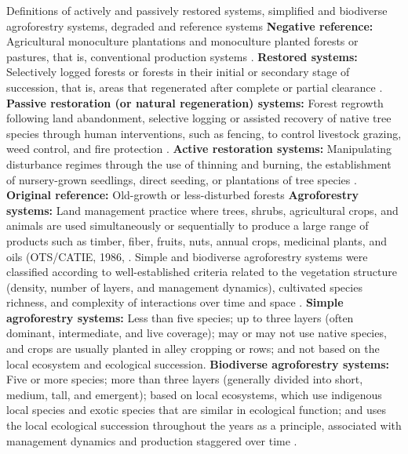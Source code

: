 \newpage
%
\begin{center}
\begin{mybox}{Definitions of actively and passively restored systems, simplified and biodiverse agroforestry systems, degraded and reference systems}
\label{Box2}
{\bf Negative reference:} Agricultural monoculture plantations and monoculture planted forests or pastures, that is, conventional production systems \citep{Crouzeilles2016a}.
%
{\bf Restored systems:} Selectively logged forests or forests in their initial or secondary stage of succession, that is, areas that regenerated after complete or partial clearance \citep{Crouzeilles2016a}. 
    {\bf Passive restoration (or natural regeneration) systems:} Forest regrowth following land abandonment, selective logging or assisted recovery of native tree species through human interventions, such as fencing, to control livestock grazing, weed control, and fire protection \citep{Shono2007, Zahawi2014, Crouzeilles2017a}.
    {\bf Active restoration systems:} Manipulating disturbance regimes through the use of thinning and burning, the establishment of nursery-grown seedlings, direct seeding, or plantations of tree species \citep{Shono2007, Zahawi2014, Crouzeilles2017a}.
%
{\bf Original reference:} Old-growth or less-disturbed forests \citep{Crouzeilles2016a}
%
{\bf Agroforestry systems:} Land management practice where trees, shrubs, agricultural crops, and animals are used simultaneously or sequentially to produce a large range of products such as timber, fiber, fruits, nuts, annual crops, medicinal plants, and oils (OTS/CATIE, 1986, \cite{May2008} . Simple and biodiverse agroforestry systems were classified according to well-established criteria related to the vegetation structure (density, number of layers, and management dynamics), cultivated species richness, and complexity of interactions over time and space \citep{Schroth2004, Steenbock2003, MiccolisAndrewPeneireiroFabianaMongeliMarquesHenriqueRodriguesVieiraDanielLuisMasciaArco-VerdeMarceloFrancioHoffmannMauricioRigonRehderTatianaPereira2016}.
    {\bf Simple agroforestry systems:} Less than five species; up to three layers (often dominant, intermediate, and live coverage); may or may not use native species, and crops are usually planted in alley cropping or rows; and not based on the local ecosystem and ecological succession.
    {\bf Biodiverse agroforestry systems:} Five or more species; more than three layers (generally divided into short, medium, tall, and emergent); based on local ecosystems, which use indigenous local species and exotic species that are similar in ecological function; and uses the local ecological succession throughout the years as a principle, associated with management dynamics and production staggered over time  \cite{Santos2019}.
\end{mybox}
\end{center}

